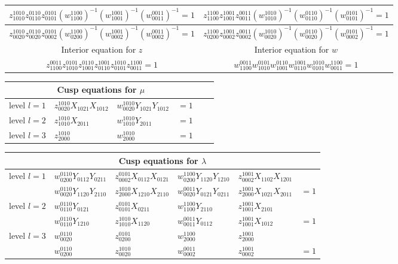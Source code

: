 \documentclass[12pt]{amsart}
\theoremstyle{definition}
\numberwithin{equation}{section}
\begin{document}
\begin{table}[p]
\begin{center}
\begin{tabular}{c|c}
$z_{1010}^{1010} z_{0110}^{0110} z_{0101}^{0101} (w_{1100}^{1100})^{-1} (w_{1001}^{1001})^{-1} (w_{0011}^{0011})^{-1}=1$ &
$z_{1100}^{1100} z_{1001}^{1001} z_{0011}^{0011} (w_{1010}^{1010})^{-1} (w_{0110}^{0110})^{-1} (w_{0101}^{0101})^{-1}=1$ \\ \hline
$z_{0020}^{1010} z_{0020}^{0110} z_{0002}^{0101} (w_{0200}^{1100})^{-1} (w_{0002}^{1001})^{-1} (w_{0002}^{0011})^{-1}=1$ &
$z_{0200}^{1100} z_{0002}^{1001} z_{0002}^{0011} (w_{0020}^{1010})^{-1} (w_{0020}^{0110})^{-1} (w_{0002}^{0101})^{-1}=1$ \\ \hline
Interior equation for $z$& Interior equation for $w$\\ \hline \hline
$z_{1100}^{0011}z^{0101}_{1010}z^{0110}_{1001}z^{1001}_{0110}z^{1010}_{0101}z^{1100}_{0011}=1$&$w_{1100}^{0011}w^{0101}_{1010}w^{0110}_{1001}w^{1001}_{0110}w^{1010}_{0101}w^{1100}_{0011}=1$
\end{tabular}
\end{center}

\begin{center}
\setlength\extrarowheight{5pt}
\begin{tabular}{llllll}
\multicolumn{4}{c}{Cusp equations for $\mu$} \\ \hline \hline
level $l=1$ &
$z^{1010}_{0020}X_{1021}X_{1012}$ & $w^{1010}_{0020}Y_{1021}Y_{1012}$ & $=1$ 
\\ \hline
level $l=2$ &
$z^{1010}_{1010}X_{2011}$ & $w^{1010}_{1010}Y_{2011}$ & $=1$\\ \hline
level $l=3$ &
$z^{1010}_{2000}$ & $w^{1010}_{2000}$ & $=1$\\ \hline
\end{tabular}
\end{center}

\begin{center}
\setlength\extrarowheight{5pt}
\begin{tabular}{llllll}
\multicolumn{6}{c}{Cusp equations for $\lambda$} \\ \hline \hline
level $l=1$ &
$w^{0110}_{0200}Y_{0112}Y_{0211}$ & $z^{0101}_{0002}X_{0112}X_{0121}$ & $w^{1100}_{0200}Y_{1120}Y_{1210}$ &
$z^{1001}_{0002}X_{1102}X_{1201}$\\
&$w^{0110}_{0020}Y_{1120}Y_{2110}$& $z_{2000}^{1010}X_{1210}X_{2110}$ & $w^{0011}_{0020}Y_{0121}Y_{0211}$ &
$z^{1001}_{2000}X_{1021}X_{2011}$ & $=1$\\ \hline
level $l=2$ &
$w^{0110}_{0110}Y_{0121}$ & $z^{0101}_{0101}X_{0211}$ & $w^{1100}_{1100}Y_{2110}$ &
$z^{1001}_{1001}X_{2101}$ \\
& $w^{0110}_{0110}Y_{1210}$ & $z_{1010}^{1010}X_{1120}$ & $w^{0011}_{0011}Y_{0112}$ &
$z^{1001}_{1001}X_{1012}$ & $=1$\\ \hline
level $l=3$ &
$w^{0110}_{0020}$ & $z^{0101}_{0200}$ & $w^{1100}_{2000}$ &
$z^{1001}_{2000}$ \\
& $w^{0110}_{0200}$ & $z_{0020}^{1010}$ & $w^{0011}_{0002}$ &
$z^{1001}_{0002}$ & $=1$\\ \hline
\end{tabular}
\end{center}
\end{table}
\end{document}

